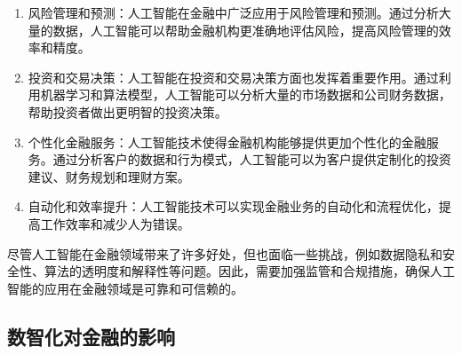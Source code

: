 \documentclass{article}
\begin{document}
\begin{enumerate}
	\item 风险管理和预测：人工智能在金融中广泛应用于风险管理和预测。通过分析大量的数据，人工智能可以帮助金融机构更准确地评估风险，提高风险管理的效率和精度。
	\item 投资和交易决策：人工智能在投资和交易决策方面也发挥着重要作用。通过利用机器学习和算法模型，人工智能可以分析大量的市场数据和公司财务数据，帮助投资者做出更明智的投资决策。
	\item 个性化金融服务：人工智能技术使得金融机构能够提供更加个性化的金融服务。通过分析客户的数据和行为模式，人工智能可以为客户提供定制化的投资建议、财务规划和理财方案。
	\item 自动化和效率提升：人工智能技术可以实现金融业务的自动化和流程优化，提高工作效率和减少人为错误。
\end{enumerate}

尽管人工智能在金融领域带来了许多好处，但也面临一些挑战，例如数据隐私和安全性、算法的透明度和解释性等问题。因此，需要加强监管和合规措施，确保人工智能的应用在金融领域是可靠和可信赖的。
  
\subsection{数智化对金融的影响}
\end{document}
